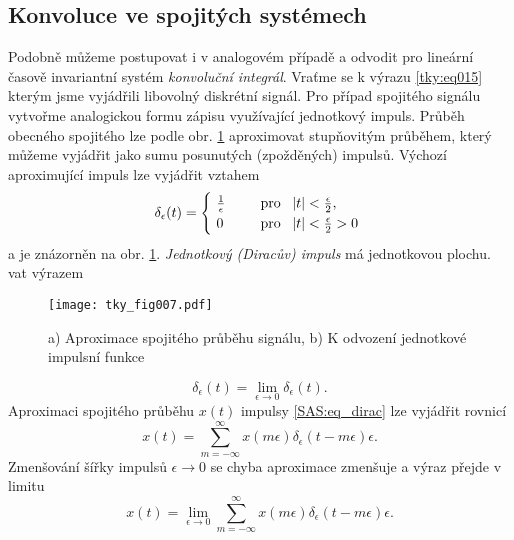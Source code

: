     \subsection{Konvoluce ve spojitých systémech}\label{tky:IchIIsecIssecIII}
      Podobně můžeme postupovat i v analogovém případě a odvodit pro lineární časově invariantní
      systém \emph{konvoluční integrál}. Vraťme se k výrazu \ref{tky:eq015} kterým jsme vyjádřili
      libovolný diskrétní signál. Pro případ spojitého signálu vytvořme analogickou formu zápisu
      využívající jednotkový impuls. Průběh obecného spojitého lze podle obr. \ref{tky:fig007}
      aproximovat stupňovitým průběhem, který můžeme vyjádřit jako sumu posunutých (zpožděných)
      impulsů. Výchozí aproximující impuls lze vyjádřit vztahem
      \begin{equation}\label{SAS:eq_dirac}
          \delta_\epsilon(t)  =
            \begin{cases}
               \frac{1}{\epsilon} & \text{pro } \abs{t} < \frac{\epsilon}{2},      \\
               0                  & \text{pro } \abs{t} < \frac{\epsilon}{2} > 0
            \end{cases}
      \end{equation}
      a je znázorněn na obr. \ref{tky:fig007}. \emph{Jednotkový (Diracův) impuls} 
      má jednotkovou plochu. vat výrazem
      \begin{figure}[ht!]
        \centering
        \texttt{[image: tky\_fig007.pdf]}
        \caption{a) Aproximace spojitého průběhu signálu, b) K odvození jednotkové impulsní funkce}
        \label{tky:fig007}
      \end{figure}
      \begin{equation}\label{SAS:eq_dirac2}
        \delta_\epsilon(t) = \lim_{\epsilon\rightarrow0} \delta_\epsilon(t).
      \end{equation}
      Aproximaci spojitého průběhu $x(t)$ impulsy \ref{SAS:eq_dirac} lze vyjádřit rovnicí
      \begin{equation}\label{SAS:eq_spojit_aprox}
        x(t) = \sum_{m = -\infty}^\infty x(m\epsilon)\delta_\epsilon(t - m\epsilon)\epsilon .
      \end{equation}
      Zmenšování šířky impulsů $\epsilon \rightarrow 0$ se chyba aproximace zmenšuje a výraz přejde v limitu
      \begin{equation}\label{SAS:eq_spojit_aprox2}
        x(t) = \lim_{\epsilon\rightarrow0}
               \sum_{m = -\infty}^\infty x(m\epsilon)\delta_\epsilon(t - m\epsilon)\epsilon .        
      \end{equation}
